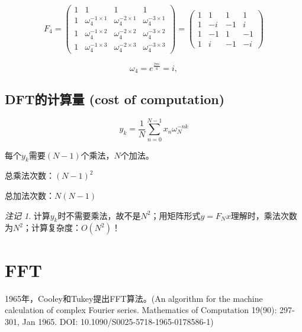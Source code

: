 \documentclass[12pt,a4paper]{article}
\numberwithin{subsection}{section}   %
\numberwithin{subsubsection}{subsection}
\theoremstyle{plain}
\theoremstyle{definition}
\theoremstyle{remark}
\newtheorem{remark}{注记}[subsection] %
\theoremstyle{remark}
\begin{document}
	\begin{equation}
		F_4 = \begin{pmatrix}
			1 & 1 & 1 & 1 \\
			1 & \omega_4^{-1 \times 1} & \omega_4^{-2 \times 1} & \omega_4^{-3 \times 1} \\
			1 & \omega_4^{-1 \times 2} & \omega_4^{-2 \times 2} & \omega_4^{-3 \times 2} \\
			1 & \omega_4^{-1 \times 3} & \omega_4^{-2 \times 3} & \omega_4^{-3 \times 3}
		\end{pmatrix}
		=
		\begin{pmatrix}
			1 & 1 & 1 & 1 \\
			1 & -i & -1 & i \\
			1 & -1 & 1 & -1 \\
			1 & i & -1 & -i
		\end{pmatrix}
	\end{equation}
	
	\begin{equation}
	\omega_4 = e^{\frac{2\pi i}{4}} = i,
		\end{equation}
	
	\subsection{ DFT的计算量 (cost of computation)}
	
	\begin{equation}
		y_k = \frac{1}{N} \sum_{n=0}^{N-1} x_n \omega_N^{-nk}
	\end{equation}
	
	每个$y_k$需要$(N-1)$个乘法，$N$个加法。
	
	总乘法次数：$(N-1)^2$
	
	总加法次数：$N(N-1)$
	
\begin{remark}
	计算$y_k$时不需要乘法，故不是$N^2$；用矩阵形式$y = F_N x$理解时，乘法次数为$N^2$；计算复杂度：$O(N^2)$！
\end{remark}

	
	\newpage
	
	\section{FFT}
	
	1965年，Cooley和Tukey提出FFT算法。(An algorithm for the machine calculation of complex Fourier series. Mathematics of Computation 19(90): 297-301, Jan 1965.
	DOI: 10.1090/S0025-5718-1965-0178586-1)	
\end{document}
